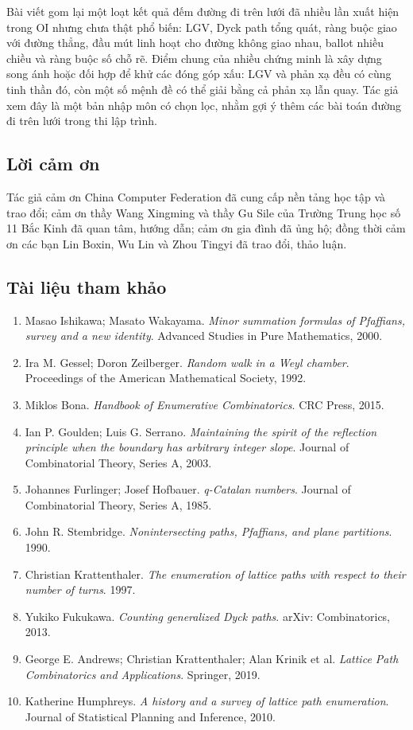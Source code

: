 \documentclass[11pt]{article}
\begin{document}
Bài viết gom lại một loạt kết quả đếm đường đi trên lưới đã nhiều lần xuất
hiện trong OI nhưng chưa thật phổ biến: LGV, Dyck path tổng quát, ràng buộc
giao với đường thẳng, đầu mút linh hoạt cho đường không giao nhau, ballot
nhiều chiều và ràng buộc số chỗ rẽ. Điểm chung của nhiều chứng minh là xây
dựng song ánh hoặc đối hợp để khử các đóng góp xấu: LGV và phản xạ đều có cùng
tinh thần đó, còn một số mệnh đề có thể giải bằng cả phản xạ lẫn quay. Tác giả
xem đây là một bản nhập môn có chọn lọc, nhằm gợi ý thêm các bài toán đường đi
trên lưới trong thi lập trình.

\subsection*{Lời cảm ơn}

Tác giả cảm ơn China Computer Federation đã cung cấp nền tảng học tập và trao
đổi; cảm ơn thầy Wang Xingming và thầy Gu Sile của Trường Trung học số 11 Bắc
Kinh đã quan tâm, hướng dẫn; cảm ơn gia đình đã ủng hộ; đồng thời cảm ơn các
bạn Lin Boxin, Wu Lin và Zhou Tingyi đã trao đổi, thảo luận.

\subsection*{Tài liệu tham khảo}

\begin{enumerate}
  \item Masao Ishikawa; Masato Wakayama. \emph{Minor summation formulas of
  Pfaffians, survey and a new identity}. Advanced Studies in Pure Mathematics,
  2000.
  \item Ira M. Gessel; Doron Zeilberger. \emph{Random walk in a Weyl chamber}.
  Proceedings of the American Mathematical Society, 1992.
  \item Miklos Bona. \emph{Handbook of Enumerative Combinatorics}. CRC Press,
  2015.
  \item Ian P. Goulden; Luis G. Serrano. \emph{Maintaining the spirit of the
  reflection principle when the boundary has arbitrary integer slope}. Journal
  of Combinatorial Theory, Series A, 2003.
  \item Johannes Furlinger; Josef Hofbauer. \emph{q-Catalan numbers}. Journal
  of Combinatorial Theory, Series A, 1985.
  \item John R. Stembridge. \emph{Nonintersecting paths, Pfaffians, and plane
  partitions}. 1990.
  \item Christian Krattenthaler. \emph{The enumeration of lattice paths with
  respect to their number of turns}. 1997.
  \item Yukiko Fukukawa. \emph{Counting generalized Dyck paths}. arXiv:
  Combinatorics, 2013.
  \item George E. Andrews; Christian Krattenthaler; Alan Krinik et al.
  \emph{Lattice Path Combinatorics and Applications}. Springer, 2019.
  \item Katherine Humphreys. \emph{A history and a survey of lattice path
  enumeration}. Journal of Statistical Planning and Inference, 2010.
\end{enumerate}
\end{document}
